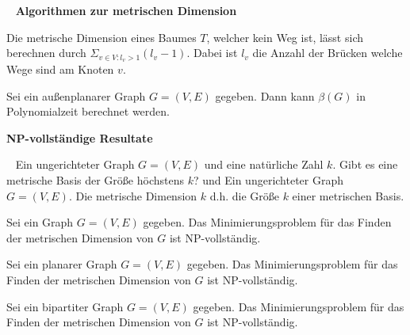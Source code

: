 ~\newline
\textbf{Algorithmen zur metrischen Dimension}
\begin{lem}\cite{landmarks} 
\label{baum}
Die metrische Dimension eines Baumes $T$, welcher kein Weg ist, lässt sich berechnen durch $\Sigma_{v \in V:l_v >1} (l_v-1)$. Dabei ist $l_v$ die Anzahl der Brücken welche Wege sind am Knoten $v$.
\end{lem}
\begin{lem}\cite{aussenplanar}
Sei ein außenplanarer Graph $G=(V,E)$ gegeben. Dann kann $\beta(G)$ in Polynomialzeit berechnet werden.
\end{lem}
\textbf{NP-vollständige Resultate}
\begin{defi}~\newline
\vspace{-7mm}
{Ein ungerichteter Graph $G=(V,E)$ und eine natürliche Zahl $k$.}
{Gibt es eine metrische Basis der Größe höchstens $k$?}
\vspace{-2mm}
\centering und
\newpage
{}
{Ein ungerichteter Graph $G=(V,E)$.}
{Die metrische Dimension $k$ d.h. die Größe $k$ einer metrischen Basis.}
\end{defi}
\begin{lem}\cite{book,landmarks}
Sei ein Graph $G=(V,E)$ gegeben. Das Minimierungsproblem für das Finden der metrischen Dimension von $G$ ist NP-vollständig.
\end{lem}
\begin{lem}\cite{aussenplanar}
Sei ein planarer Graph $G=(V,E)$ gegeben. Das Minimierungsproblem für das Finden der metrischen Dimension von $G$ ist NP-vollständig.
\end{lem}
\begin{lem}\cite{bipartitnp}
Sei ein bipartiter Graph $G=(V,E)$ gegeben. Das Minimierungsproblem für das Finden der metrischen Dimension von $G$ ist NP-vollständig.
\end{lem}
